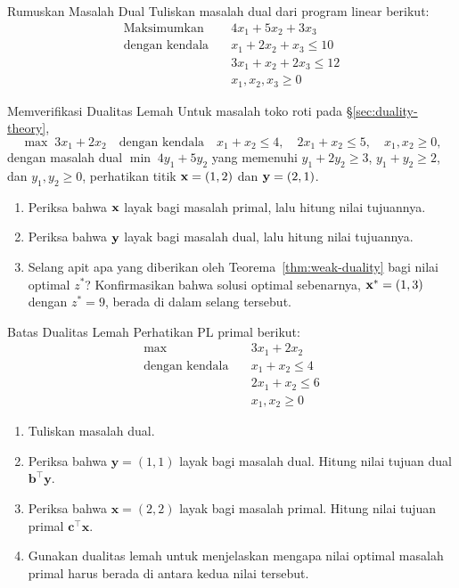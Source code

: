 \begin{ex}{Rumuskan Masalah Dual}{}
\label{ex:formulate-dual}
 Tuliskan masalah dual dari program linear berikut:
\[
\begin{aligned}
\text{Maksimumkan} \quad & 4x_1 + 5x_2 + 3x_3 \\
\text{dengan kendala} \quad
& x_1 + 2x_2 + x_3 \leq 10 \\
& 3x_1 + x_2 + 2x_3 \leq 12 \\
& x_1, x_2, x_3 \geq 0
\end{aligned}
\]
\exrefs{\S\ref{sec:duality-theory}, \S\ref{sec:duality-strong}}
\end{ex}

\begin{ex}{Memverifikasi Dualitas Lemah}{}
\label{ex:weak-duality-check}
 Untuk masalah toko roti pada \S\ref{sec:duality-theory},
\[
\max \; 3x_1 + 2x_2 \quad \text{dengan kendala} \quad x_1 + x_2 \leq 4, \quad 2x_1 + x_2 \leq 5, \quad x_1, x_2 \geq 0,
\]
dengan masalah dual $\min \; 4y_1 + 5y_2$ yang memenuhi $y_1 + 2y_2 \geq 3$, $y_1 + y_2 \geq 2$, dan $y_1, y_2 \geq 0$, perhatikan titik $\mathbf{x} = (1, 2)$ dan $\mathbf{y} = (2, 1)$.
\begin{enumerate}
\item Periksa bahwa $\mathbf{x}$ layak bagi masalah primal, lalu hitung nilai tujuannya.
\item Periksa bahwa $\mathbf{y}$ layak bagi masalah dual, lalu hitung nilai tujuannya.
\item Selang apit apa yang diberikan oleh Teorema~\ref{thm:weak-duality} bagi nilai optimal $z^*$? Konfirmasikan bahwa solusi optimal sebenarnya, $\mathbf{x}^* = (1,3)$ dengan $z^* = 9$, berada di dalam selang tersebut.
\end{enumerate}
\end{ex}


\begin{ex}{Batas Dualitas Lemah}{}
\label{ex:weak-duality-bound}
 Perhatikan PL primal berikut:
\[
\begin{aligned}
\max \quad & 3x_1 + 2x_2 \\
\text{dengan kendala} \quad & x_1 + x_2 \leq 4 \\
& 2x_1 + x_2 \leq 6 \\
& x_1, x_2 \geq 0
\end{aligned}
\]
\begin{enumerate}
\item Tuliskan masalah dual.
\item Periksa bahwa $\mathbf{y} = (1, 1)$ layak bagi masalah dual. Hitung nilai tujuan dual $\mathbf{b}^\top \mathbf{y}$.
\item Periksa bahwa $\mathbf{x} = (2, 2)$ layak bagi masalah primal. Hitung nilai tujuan primal $\mathbf{c}^\top \mathbf{x}$.
\item Gunakan dualitas lemah untuk menjelaskan mengapa nilai optimal masalah primal harus berada di antara kedua nilai tersebut.
\end{enumerate}
\end{ex}

